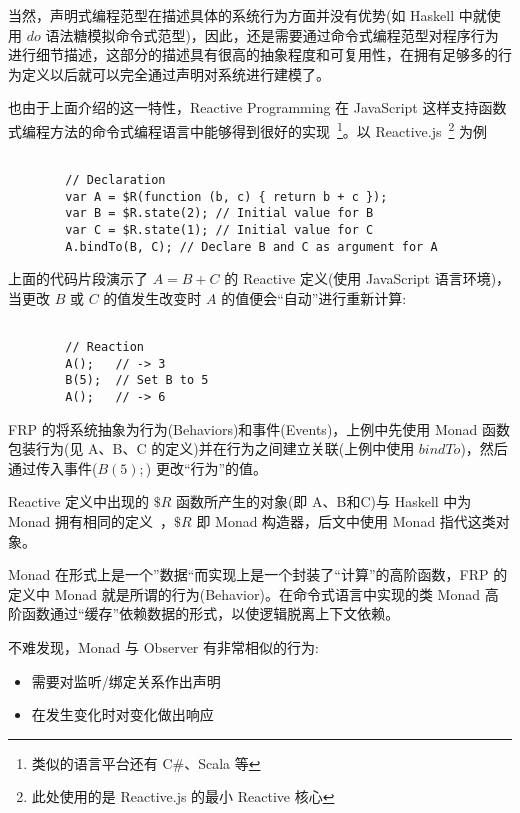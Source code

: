 当然，声明式编程范型在描述具体的系统行为方面并没有优势(如 Haskell 中就使用 $do$ 语法糖模拟命令式范型)，因此，还是需要通过命令式编程范型对程序行为进行细节描述，这部分的描述具有很高的抽象程度和可复用性，在拥有足够多的行为定义以后就可以完全通过声明对系统进行建模了。

也由于上面介绍的这一特性，Reactive Programming 在 JavaScript 这样支持函数式编程方法的命令式编程语言中能够得到很好的实现~\footnote{类似的语言平台还有 C\#、Scala 等}。以 Reactive.js~\footnote{此处使用的是 Reactive.js 的最小 Reactive 核心} 为例~\cite{Carkci2013}

\begin{verbatim}

        // Declaration
        var A = $R(function (b, c) { return b + c });
        var B = $R.state(2); // Initial value for B
        var C = $R.state(1); // Initial value for C
        A.bindTo(B, C); // Declare B and C as argument for A

\end{verbatim}

上面的代码片段演示了 $A = B + C$ 的 Reactive 定义(使用 JavaScript 语言环境)，当更改 $B$ 或 $C$ 的值发生改变时 $A$ 的值便会“自动”进行重新计算:

\begin{verbatim}

        // Reaction
        A();   // -> 3
        B(5);  // Set B to 5
        A();   // -> 6

\end{verbatim}

FRP 的将系统抽象为行为(Behaviors)和事件(Events)，上例中先使用 Monad 函数包装行为(见 A、B、C 的定义)并在行为之间建立关联(上例中使用 $bindTo$)，然后通过传入事件($B(5);$) 更改“行为”的值。

Reactive 定义中出现的 $\$R$ 函数所产生的对象(即 A、B和C)与 Haskell 中为 Monad 拥有相同的定义~\cite{raey}，$\$R$ 即 Monad 构造器，后文中使用 Monad 指代这类对象。

Monad 在形式上是一个”数据“而实现上是一个封装了“计算”的高阶函数，FRP 的定义中 Monad 就是所谓的行为(Behavior)。在命令式语言中实现的类 Monad 高阶函数通过“缓存”依赖数据的形式，以使逻辑脱离上下文依赖。

不难发现，Monad 与 Observer 有非常相似的行为:

\begin{itemize}
  \item 需要对监听/绑定关系作出声明
  \item 在发生变化时对变化做出响应
\end{itemize}

